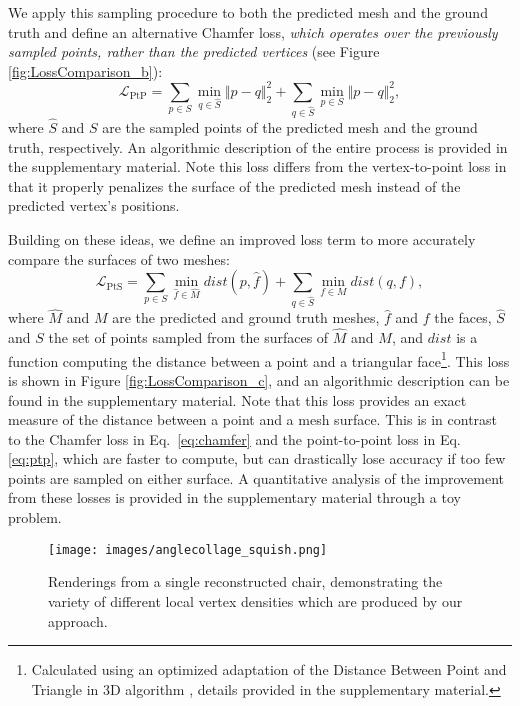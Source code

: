 \documentclass{article}
\begin{document}
We apply this sampling procedure to both the predicted mesh and the ground truth and define an alternative Chamfer loss, \emph{which operates over the previously sampled points, rather than the predicted vertices} (see Figure \ref{fig:LossComparison_b}):
\begin{equation}
\mathcal{L}_{\text{PtP}}= \sum_{p \in S} \min_{q \in \hat S} \Vert p - q \Vert^2_2 + \sum_{q \in \hat S} \min_{p \in S} \Vert p - q \Vert^2_2,
\end{equation} 
where $\hat S$ and $S$ are the sampled points of the predicted mesh and the ground truth, respectively. An algorithmic description of the entire process is provided in the supplementary material. Note this loss differs from the vertex-to-point loss in that it properly penalizes the surface of the predicted mesh instead of the predicted vertex's positions.

Building on these ideas, we define an improved loss term to more accurately compare the surfaces of two meshes: 
\begin{equation}
\mathcal{L}_{\text{PtS}}= \sum_{p \in S} \min_{\hat{f} \in \hat{M}} dist(p, \hat{f}) + \sum_{q \in \hat{S}} \min_{f \in M} dist(q, f), 
\label{eq:ptp}
\end{equation}
where $\hat M$ and $M$ are the predicted and ground truth meshes, $\hat f$ and $f$ the faces, $\hat S$ and $S$ the set of points sampled from the surfaces of $\hat M$ and $M$, and $dist$ is a function computing the distance between a point and a triangular face\footnote{Calculated using an optimized adaptation of the Distance Between Point and Triangle in 3D algorithm \cite{Point2Tri}, details provided in the supplementary material.}. This loss is shown in Figure \ref{fig:LossComparison_c}, and an algorithmic description can be found in the supplementary material. Note that this loss provides an exact measure of the distance between a point and a mesh surface. This is in contrast to the Chamfer loss in Eq.~\ref{eq:chamfer} and the point-to-point loss in Eq. \ref{eq:ptp}, which are faster to compute, but can drastically lose accuracy if too few points are sampled on either surface. A quantitative analysis of the improvement from these losses is provided in the supplementary material through a toy problem.

\begin{figure}[t!]
\centering
\texttt{[image: images/anglecollage\_squish.png]}
\vspace{-4mm}
\caption{Renderings from a single reconstructed chair, demonstrating the variety of different local vertex densities which are produced by our approach. } \label{fig:VertexDensity}
\end{figure}
\end{document}
